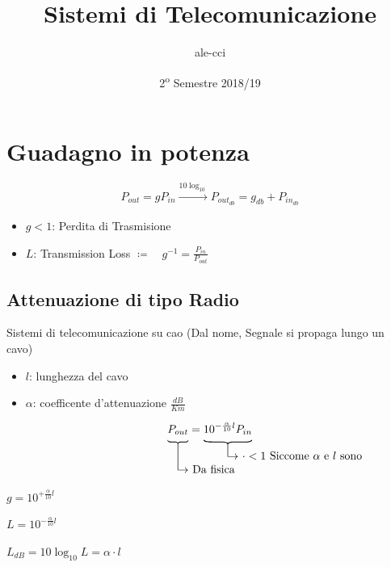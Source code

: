 \documentclass{article}
\date{2\textsuperscript{o} Semestre 2018/19}
\title{Sistemi di Telecomunicazione}
\author{ale-cci }
\def\myupbracefill#1{\rotatebox{90}{\stretchto{\{}{#1}}}
\def\rlwd{.5pt}
\newcommand\notate[4][B]{%
  \if B#1\else\def\myupbracefill##1{}\fi%
  \def\useanchorwidth{T}%
  \setbox0=\hbox{$\displaystyle#2$}%
  \def\stackalignment{c}\stackunder[-6pt]{%
    \def\stackalignment{c}\stackunder[-1.5pt]{%
      \stackunder[2pt]{\strut $\displaystyle#2$}{\myupbracefill{\wd0}}}{%
    \rule{\rlwd}{#3\baselineskip}}}{%
  \strut\kern9pt$\rightarrow$\smash{\rlap{$~\displaystyle#4$}}}%
}
\begin{document}
\begin{titlingpage}
\maketitle
\end{titlingpage}

\newpage

\section{Guadagno in potenza}

\[
    P_{out} = gP_{in}  \xrightarrow[]{10\log_{10}{}} P_{out_{db}} = g_{db} + P_{in_{db}}
\]

\begin{itemize}
    \item $g < 1$: Perdita di Trasmisione

    \item $L$: Transmission Loss $\coloneqq \quad g^{-1}=\frac{P_{in}}{P_{out}}$

\end{itemize}

\subsection{Attenuazione di tipo Radio}
Sistemi di telecomunicazione su cao (Dal nome, Segnale si propaga lungo un cavo)

\begin{itemize}
    \item $l$: lunghezza del cavo
    \item $\alpha$: coefficente d'attenuazione $\frac{dB}{Km}$
\end{itemize}

\[
    \notate{P_{out}}{2}{\text{Da fisica}} = \notate{10^{-\frac{\alpha}{10}l} P_{in} }{1}{\text{$\cdot < 1 $ Siccome $\alpha$ e $l$ sono positivi}}
\]

$g = 10^{+\frac{\alpha}{10}l}$

$L=10^{-\frac{\alpha}{10} l}$

$L_{dB} = 10\log_{10} L = \alpha \cdot l$
\end{document}
